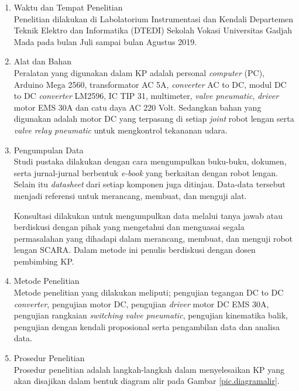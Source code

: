 \begin{enumerate}
	\item Waktu dan Tempat Penelitian \\
	Penelitian dilakukan di Labolatorium Instrumentasi dan Kendali Departemen Teknik Elektro dan Informatika (DTEDI) Sekolah Vokasi Universitas Gadjah Mada pada bulan Juli sampai bulan Agustus 2019.
	
	\item Alat dan Bahan \\
	Peralatan yang digunakan dalam KP adalah personal \textit{computer} (PC), Arduino Mega 2560, transformator AC 5A, \textit{converter} AC to DC, modul DC to DC \textit{converter} LM2596, IC TIP 31, multimeter,\textit{ valve pneumatic}, \textit{driver} motor EMS 30A dan catu daya AC 220 Volt. Sedangkan bahan yang digunakan adalah motor DC yang terpasang di setiap \emph {joint} robot lengan serta \textit{valve relay pneumatic} untuk mengkontrol tekananan udara.
	
	\item  Pengumpulan Data \\
	Studi pustaka dilakukan dengan cara mengumpulkan buku-buku, dokumen, serta jurnal-jurnal berbentuk \emph{e-book} yang berkaitan dengan robot lengan. Selain itu \emph{datasheet} dari setiap komponen juga ditinjau. Data-data tersebut menjadi referensi untuk merancang, membuat, dan menguji alat. 
	
	Konsultasi dilakukan untuk mengumpulkan data melalui tanya jawab atau berdiskusi dengan pihak yang mengetahui dan menguasai segala permasalahan yang dihadapi dalam merancang, membuat, dan menguji robot lengan SCARA. Dalam metode ini penulis berdiskusi dengan dosen pembimbing KP. 
	
	\item Metode Penelitian \\
	Metode penelitian yang dilakukan meliputi; pengujian tegangan DC to DC \textit{converter}, pengujian motor DC, pengujian \textit{driver} motor DC EMS 30A, pengujian rangkaian \textit{switching valve pneumatic}, pengujian kinematika balik, pengujian dengan kendali proposional serta pengambilan data dan analisa data.
	
	\item Prosedur Penelitian\\
	Prosedur penelitian adalah langkah-langkah dalam menyelesaikan KP yang akan disajikan dalam bentuk diagram alir pada Gambar \ref{pic.diagramalir}.
	

\end{enumerate}
